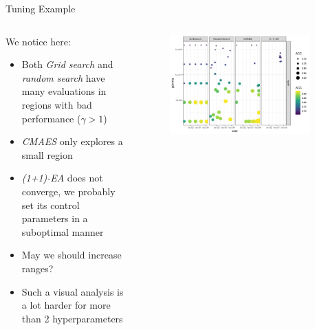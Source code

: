 \begin{frame}{Tuning Example}

\begin{columns}
\begin{column}{0.45\textwidth}
  \vspace{1em}

  We notice here:

  \begin{itemize}
      \item Both \emph{Grid search} and \emph{random search} have many evaluations in regions with bad performance ($\gamma>1$)
      \item \emph{CMAES} only explores a small region
      \item \emph{(1+1)-EA} does not converge, we probably set its control parameters in a suboptimal manner
      \item May we should increase ranges?
      \item Such a visual analysis is a lot harder for more than 2 hyperparameters
  \end{itemize}
\end{column}%
\begin{column}{0.5\textwidth}
  \vspace{-1em}
  \begin{figure}
  \includegraphics[width=0.9\textwidth]{images/benchmark_scatter.png}
  \end{figure}
\end{column}
\end{columns}

\end{frame}
